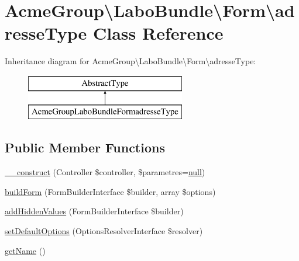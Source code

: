 \hypertarget{class_acme_group_1_1_labo_bundle_1_1_form_1_1adresse_type}{\section{Acme\+Group\textbackslash{}Labo\+Bundle\textbackslash{}Form\textbackslash{}adresse\+Type Class Reference}
\label{class_acme_group_1_1_labo_bundle_1_1_form_1_1adresse_type}
}
Inheritance diagram for Acme\+Group\textbackslash{}Labo\+Bundle\textbackslash{}Form\textbackslash{}adresse\+Type\+:\begin{figure}[H]
\begin{center}
\leavevmode
\includegraphics[height=2.000000cm]{class_acme_group_1_1_labo_bundle_1_1_form_1_1adresse_type}
\end{center}
\end{figure}
\subsection*{Public Member Functions}
\begin{DoxyCompactItemize}
\item 
\hyperlink{class_acme_group_1_1_labo_bundle_1_1_form_1_1adresse_type_a59c3b576d19101e8e9747a8ffb83819d}{\+\_\+\+\_\+construct} (Controller \$controller, \$parametres=\hyperlink{validate_8js_afb8e110345c45e74478894341ab6b28e}{null})
\item 
\hyperlink{class_acme_group_1_1_labo_bundle_1_1_form_1_1adresse_type_a381bf4dfed5425148a38a49e8527797d}{build\+Form} (Form\+Builder\+Interface \$builder, array \$options)
\item 
\hyperlink{class_acme_group_1_1_labo_bundle_1_1_form_1_1adresse_type_a5c6e1ad09bfac3ce8d74f2984c7d0b16}{add\+Hidden\+Values} (Form\+Builder\+Interface \$builder)
\item 
\hyperlink{class_acme_group_1_1_labo_bundle_1_1_form_1_1adresse_type_a1333f64d2a137b9e6b5a85f8efd1dcf4}{set\+Default\+Options} (Options\+Resolver\+Interface \$resolver)
\item 
\hyperlink{class_acme_group_1_1_labo_bundle_1_1_form_1_1adresse_type_a26883b4bdf404c998d82da207a582c13}{get\+Name} ()
\end{DoxyCompactItemize}



